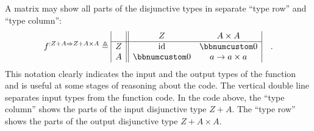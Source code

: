 A matrix may show all parts of the disjunctive types in separate ``type
row'' and ``type column'':
\begin{equation}
f^{:Z+A\Rightarrow Z+A\times A}\triangleq\begin{array}{|c||cc|}
 & Z & A\times A\\
\hline Z & \text{id} & \bbnum 0\\
A & \bbnum 0 & a\rightarrow a\times a
\end{array}\quad.
\end{equation}
This notation clearly indicates the input and the output types of
the function and is useful at some stages of reasoning about the code.
The vertical double line separates input types from the function code.
In the code above, the ``type column'' shows the parts of the input
disjunctive type $Z+A$. The ``type row'' shows the parts of the
output disjunctive type $Z+A\times A$.


